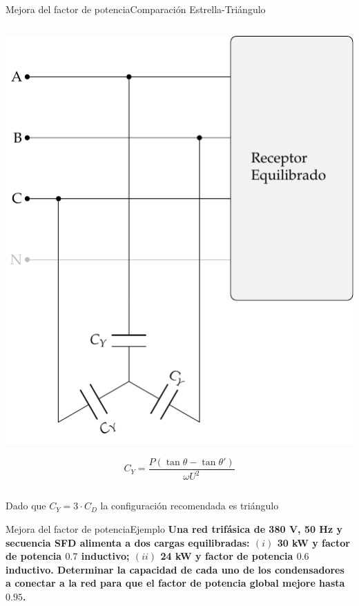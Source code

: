 \documentclass[aspectratio=169, xcolor={usenames,svgnames,dvipsnames}]{beamer}
\begin{document}
\begin{frame}{Mejora del factor de potencia}{Comparación Estrella-Triángulo}
\begin{columns}
\begin{column}{0.5\columnwidth}
\begin{center}
\includegraphics[height=0.55\textheight]{../figs/CircuitoTrifasicaY_CompensacionReactiva.pdf}
\end{center}
\[
  \boxed{C_Y = \frac{P(\tan \theta - \tan \theta')}{\omega U^2}}
\]

\medskip
\end{column}
\end{columns}

Dado que \(C_Y = 3 \cdot C_D\) la \alert{configuración recomendada} es \alert{triángulo}
\end{frame}

\begin{frame}{Mejora del factor de potencia}{Ejemplo}
    \textbf{Una red trifásica de 380 V, 50 Hz y secuencia SFD alimenta a dos cargas equilibradas: $(i)$ 30 kW y factor de potencia $0.7$ inductivo; $(ii)$ 24 kW y factor de potencia $0.6$ inductivo. Determinar la capacidad de cada uno de los condensadores a conectar a la red para que el factor de potencia global mejore hasta $0.95$.}
\end{frame}
\end{document}
